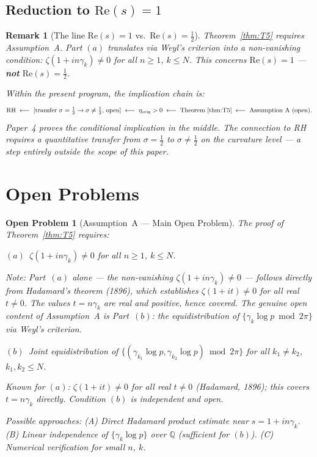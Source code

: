 \documentclass[11pt]{article}
\newtheorem*{remark}{Remark}
\newtheorem*{openproblem}{Open Problem}
\newcommand{\etaorig}{\eta_{\mathrm{orig}}}
\begin{document}
\subsection{Reduction to $\mathrm{Re}(s) = 1$}

\begin{remark}[The line $\mathrm{Re}(s)=1$ vs.\ $\mathrm{Re}(s)=\tfrac{1}{2}$]
Theorem~\ref{thm:T5} requires Assumption~A.
Part $(a)$ translates via Weyl's criterion into a non-vanishing condition:
$\zeta(1+in\gamma_k)\neq 0$ for all $n\geq 1$, $k\leq N$.
This concerns $\mathrm{Re}(s)=1$ --- \textbf{not} $\mathrm{Re}(s)=\tfrac{1}{2}$.

Within the present program, the implication chain is:
\[
\mathrm{RH}
\;\longleftarrow\;
[\text{transfer } \sigma=\tfrac{1}{2}\to\sigma\neq\tfrac{1}{2},\,\text{open}]
\;\longleftarrow\; \etaorig > 0
\;\longleftarrow\; \text{Theorem~\ref{thm:T5}}
\;\longleftarrow\; \text{Assumption~A (open)}.
\]
Paper~4 proves the conditional implication in the middle.
The connection to RH requires a quantitative transfer from
$\sigma=\tfrac{1}{2}$ to $\sigma\neq\tfrac{1}{2}$ on the curvature level
--- a step entirely outside the scope of this paper.
\end{remark}

\section{Open Problems}

\begin{openproblem}[Assumption~A --- Main Open Problem]
The proof of Theorem~\ref{thm:T5} requires:

$(a)$~$\zeta(1+in\gamma_k)\neq 0$ for all $n\geq 1$, $k\leq N$.

\emph{Note: Part~$(a)$ alone --- the non-vanishing
$\zeta(1+in\gamma_k)\neq 0$ --- follows directly from
Hadamard's theorem (1896), which establishes
$\zeta(1+it)\neq 0$ for all real $t\neq 0$.
The values $t = n\gamma_k$ are real and positive, hence covered.
The genuine open content of Assumption~A is Part~$(b)$:
the equidistribution of $\{\gamma_k\log p\bmod 2\pi\}$
via Weyl's criterion.}

$(b)$~Joint equidistribution of
$\{(\gamma_{k_1}\log p,\gamma_{k_2}\log p)\bmod 2\pi\}$
for all $k_1\neq k_2$, $k_1,k_2\leq N$.

Known for $(a)$: $\zeta(1+it)\neq 0$ for all real $t\neq 0$
(Hadamard, 1896); this covers $t = n\gamma_k$ directly.
Condition $(b)$ is independent and open.

Possible approaches:
(A) Direct Hadamard product estimate near $s = 1+in\gamma_k$.
(B) Linear independence of $\{\gamma_k\log p\}$ over $\mathbb{Q}$
  (sufficient for $(b)$).
(C) Numerical verification for small $n$, $k$.
\end{openproblem}
\end{document}
